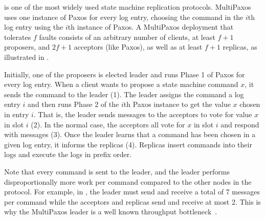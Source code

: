 {}

 is one of the most widely used state machine replication
protocols.  MultiPaxos uses one instance of Paxos for every log entry, choosing
the command in the $i$th log entry using the $i$th instance of Paxos.  A
MultiPaxos deployment that tolerates $f$ faults consists of an arbitrary number
of clients, at least $f+1$ proposers, and $2f+1$ acceptors (like Paxos), as
well as at least $f+1$ replicas, as illustrated in .

{}

Initially, one of the proposers is elected leader and runs Phase 1 of Paxos for
every log entry. When a client wants to propose a state machine command
$x$, it sends the command to the leader (1). The leader assigns the command a
log entry $i$ and then runs Phase 2 of the $i$th Paxos instance to get the
value $x$ chosen in entry $i$. That is, the leader sends 
messages to the acceptors to vote for value $x$ in slot $i$ (2). In the normal
case, the acceptors all vote for $x$ in slot $i$ and respond with
 messages (3). Once the leader learns that a command has
been chosen in a given log entry, it informs the replicas (4). Replicas insert
commands into their logs and execute the logs in prefix order.

Note that every command is sent to the leader, and the leader performs
disproportionally more work per command compared to the other nodes in the
protocol. For example, in , the leader must send and receive
a total of 7 messages per command while the acceptors and replicas send and
receive at most 2. This is why the MultiPaxos leader is a well known throughput
bottleneck~\cite{mao2008mencius, moraru2013there}.

